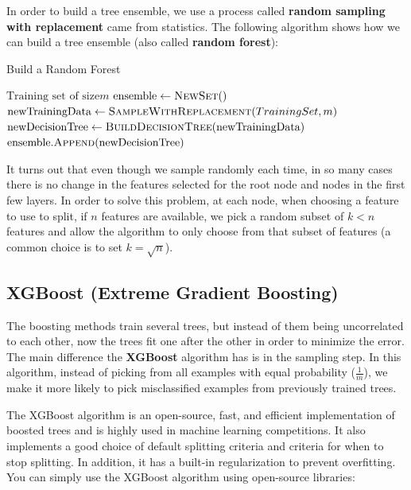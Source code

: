 \documentclass[a4paper, 12pt]{book}
\begin{document}
In order to build a tree ensemble, we use a process called \textbf{random sampling with replacement} came from statistics. The following algorithm shows how we can build a tree ensemble (also called \textbf{random forest}):

\begin{algorithm}
\caption{Build a Random Forest}
\begin{algorithmic} [1]
\Require $\text{Training set of size} m$
\State $\text{ensemble} \gets \Call{NewSet}$
    \State $\text{newTrainingData} \gets \Call{SampleWithReplacement}{TrainingSet, m}$
    \State $\text{newDecisionTree} \gets \Call{BuildDecisionTree}{\text{newTrainingData}}$ 
    \State $\text{ensemble.}\Call{Append}{\text{newDecisionTree}}$
\EndFor
\end{algorithmic}
\end{algorithm}

It turns out that even though we sample randomly each time, in so many cases there is no change in the features selected for the root node and nodes in the first few layers. In order to solve this problem, at each node, when choosing a feature to use to split, if $n$ features are available, we pick a random subset of $k < n$ features and allow the algorithm to only choose from that subset of features (a common choice is to set $k = \sqrt{n}$).

\subsection{XGBoost (Extreme Gradient Boosting)}

The boosting methods train several trees, but instead of them being uncorrelated to each other, now the trees fit one after the other in order to minimize the error. The main difference the \textbf{XGBoost} algorithm has is in the sampling step. In this algorithm, instead of picking from all examples with equal probability ($\frac{1}{m}$), we make it more likely to pick misclassified examples from previously trained trees.

The XGBoost algorithm is an open-source, fast, and efficient implementation of boosted trees and is highly used in machine learning competitions. It also implements a good choice of default splitting criteria and criteria for when to stop splitting. In addition, it has a built-in regularization to prevent overfitting. You can simply use the XGBoost algorithm using open-source libraries:
\end{document}
